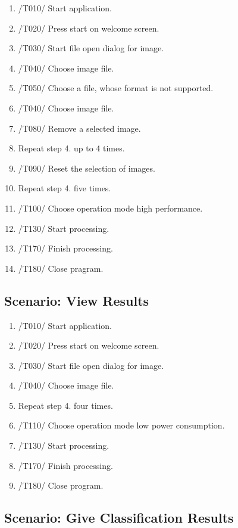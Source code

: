 \documentclass[parskip=full]{scrartcl}
\begin{document}
\begin{enumerate}
	\item /T010/ Start application. 
	\item /T020/ Press start on welcome screen.
	\item /T030/ Start file open dialog for image.
	\item /T040/ Choose image file.
	\item /T050/ Choose a file, whose format is not supported.
	\item /T040/ Choose image file.
	\item /T080/ Remove a selected image.
	\item Repeat step 4. up to 4 times.
	\item /T090/ Reset the selection of images. 
	\item Repeat step 4. five times.
	\item /T100/ Choose operation mode high performance.
	\item /T130/ Start processing.
	\item /T170/ Finish processing.
	\item /T180/ Close pragram.
\end{enumerate}

\pagebreak



\subsection {Scenario: View Results}

\begin{enumerate}
	\item /T010/ Start application.  
	\item /T020/ Press start on welcome screen.
	\item /T030/ Start file open dialog for image.
	\item /T040/ Choose image file.
	\item Repeat step 4. four times.
	\item /T110/ Choose operation mode low power consumption.
	\item /T130/ Start processing.
	\item /T170/ Finish processing.
	\item /T180/ Close program.
\end{enumerate}

\pagebreak

\subsection {Scenario: Give Classification Results}
\end{document}
